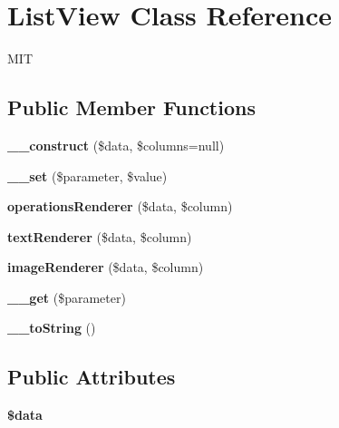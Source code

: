 \hypertarget{class_list_view}{
\section{ListView Class Reference}
\label{class_list_view}
}


MIT  


\subsection*{Public Member Functions}
\begin{DoxyCompactItemize}
\item 
\hypertarget{class_list_view_a1761853e58b7c9eb9db9a53f5798babc}{
{\bfseries \_\-\_\-construct} (\$data, \$columns=null)}
\label{class_list_view_a1761853e58b7c9eb9db9a53f5798babc}

\item 
\hypertarget{class_list_view_aac78f0af0420586af4d3826acb0912bd}{
{\bfseries \_\-\_\-set} (\$parameter, \$value)}
\label{class_list_view_aac78f0af0420586af4d3826acb0912bd}

\item 
\hypertarget{class_list_view_aa4824be29c5922a9d70f6e0f4404901c}{
{\bfseries operationsRenderer} (\$data, \$column)}
\label{class_list_view_aa4824be29c5922a9d70f6e0f4404901c}

\item 
\hypertarget{class_list_view_ac65fbbefdeacd55acc6492922c49ebde}{
{\bfseries textRenderer} (\$data, \$column)}
\label{class_list_view_ac65fbbefdeacd55acc6492922c49ebde}

\item 
\hypertarget{class_list_view_aced1bee0de34b53225905030ab8e2997}{
{\bfseries imageRenderer} (\$data, \$column)}
\label{class_list_view_aced1bee0de34b53225905030ab8e2997}

\item 
\hypertarget{class_list_view_a945c5ddc5f51c82bf8c1ac9760a2cda1}{
{\bfseries \_\-\_\-get} (\$parameter)}
\label{class_list_view_a945c5ddc5f51c82bf8c1ac9760a2cda1}

\item 
\hypertarget{class_list_view_a2bbfe505eb50a80d5d88d26d0c3f553c}{
{\bfseries \_\-\_\-toString} ()}
\label{class_list_view_a2bbfe505eb50a80d5d88d26d0c3f553c}

\end{DoxyCompactItemize}
\subsection*{Public Attributes}
\begin{DoxyCompactItemize}
\item 
\hypertarget{class_list_view_a185e1f435b469a84184b981382111a1f}{
{\bfseries \$data}}
\label{class_list_view_a185e1f435b469a84184b981382111a1f}

\end{DoxyCompactItemize}


